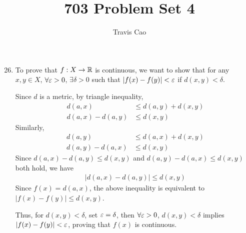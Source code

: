 \documentclass[11pt]{article}
\title{703 Problem Set 4}
\author{Travis Cao}
\begin{document}
\maketitle

\begin{enumerate}
  \setcounter{enumi}{25}
  \item %
    To prove that $f: X \rightarrow \mathbb R$ is continuous, we want to show that for any $x, y \in X$, $\forall \varepsilon > 0$, $\exists \delta > 0$ such that $|f(x) - f(y)| < \varepsilon$ if $d(x, y) < \delta$. 

    Since $d$ is a metric, by triangle inequality, 
    \begin{align*}
      d(a, x) &\leq d(a, y) + d(x, y) \\
      d(a, x) - d(a, y) &\leq d(x, y) 
    \end{align*}
    Similarly, 
    \begin{align*}
      d(a, y) &\leq d(a, x) + d(x, y) \\
      d(a, y) - d(a, x) &\leq d(x, y)
    \end{align*}
    Since $d(a, x) - d(a, y) \leq d(x, y)$ and $d(a, y) - d(a, x) \leq d(x, y)$ both hold, we have
    \begin{align*}
      |d(a, x) - d(a, y)| \leq d(x, y)
    \end{align*}
    Since $f(x) = d(a, x)$, the above inequality is equivalent to $|f(x) - f(y)| \leq d(x, y)$. 

    Thus, for $d(x, y) < \delta$, set $\varepsilon = \delta$, then $\forall \varepsilon > 0$, $d(x, y) < \delta$ implies $|f(x) - f(y)| < \varepsilon$, proving that $f(x)$ is continuous. 
\end{enumerate}
\end{document}

